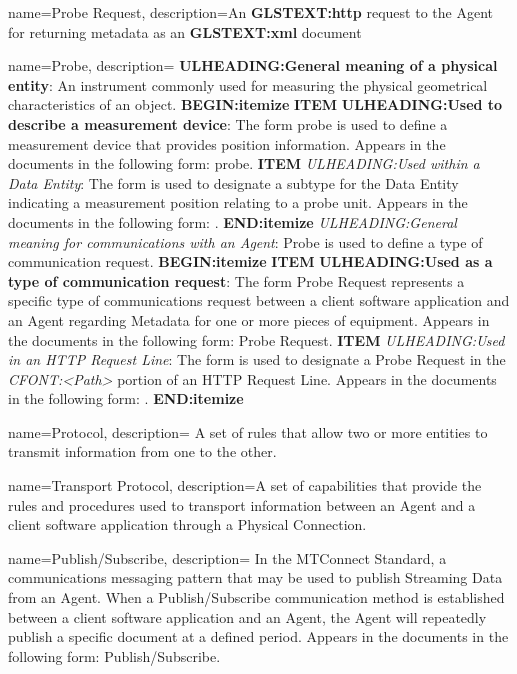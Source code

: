 {
    name={Probe Request},
	description={An \textbf{GLSTEXT:http} request to the \gls{Agent} for returning metadata as an  \textbf{GLSTEXT:xml} document}
}

{
    name={Probe},
	description={
	\textbf{ULHEADING:General meaning of a physical entity}:
	An instrument commonly used for measuring the physical geometrical characteristics of an object.
    \textbf{BEGIN:itemize}
	\textbf{ITEM} \textbf{ULHEADING:Used to describe a measurement device}:
	The form probe is used to define a measurement device that provides position information.
	Appears in the documents in the following form: probe. 
	\textbf{ITEM} \textit{ULHEADING:Used within a \gls{Data Entity}}:
	The form  is used to designate a subtype for the \gls{Data Entity}  indicating a measurement position relating to a probe unit.
	Appears in the documents in the following form: .
    \textbf{END:itemize}
	\textit{ULHEADING:General meaning for communications with an \gls{Agent}}:
	Probe is used to define a type of communication request. 
    \textbf{BEGIN:itemize}
	\textbf{ITEM} \textbf{ULHEADING:Used as a type of communication request}:
	The form \gls{Probe Request} represents a specific type of communications request between a client software application and an \gls{Agent} regarding \gls{Metadata} for one or more pieces of equipment.
	Appears in the documents in the following form: \gls{Probe Request}.
	\textbf{ITEM} \textit{ULHEADING:Used in an \gls{HTTP Request Line}}:
	The form  is used to designate a \gls{Probe Request} in the \textit{CFONT:<Path>} portion of an \gls{HTTP Request Line}.
	Appears in the documents in the following form: .
    \textbf{END:itemize}
}
}

{
    name={Protocol},
	description={
	A set of rules that allow two or more entities to transmit information from one to the other.
}
}

{
    name={Transport Protocol},
	description={A set of capabilities that provide the rules and procedures used to transport information between an \gls{Agent} and a client software application through a \gls{Physical Connection}.}
}

{
    name={Publish/Subscribe},
	description={
	In the MTConnect Standard, a communications messaging pattern that may be used to publish \gls{Streaming Data} from an \gls{Agent}.  When a \gls{Publish/Subscribe} communication method is established between a client software application and an \gls{Agent}, the \gls{Agent} will repeatedly publish a specific  document at a defined period.
	Appears in the documents in the following form: \gls{Publish/Subscribe}.
}
}

